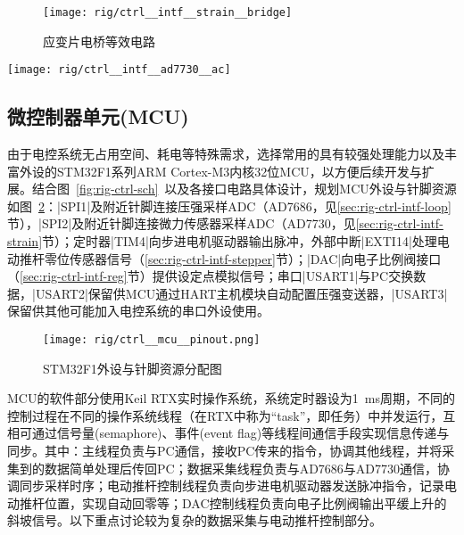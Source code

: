 \begin{figure}[p]
\centering
\texttt{[image: rig/ctrl\_\_intf\_\_strain\_\_bridge]}
\caption{应变片电桥等效电路}
\label{fig:rig-ctrl-strain-bridge}
\end{figure}

\begin{sidewaysfigure}[p]
\centering
\texttt{[image: rig/ctrl\_\_intf\_\_ad7730\_\_ac]}
\caption{AD7730电桥接口 \csep 接法示意图}
\label{fig:rig-ctrl-ad7730-ac}
\end{sidewaysfigure}


\clearpage


\subsection{微控制器单元(MCU)}\label{sec:rig-ctrl-mcu}

由于电控系统无占用空间、耗电等特殊需求，选择常用的具有较强处理能力以及丰富外设的STM32F1系列ARM Cortex-M3内核32位MCU，以方便后续开发与扩展。结合图~\ref{fig:rig-ctrl-sch}~以及各接口电路具体设计，规划MCU外设与针脚资源如图~\ref{fig:rig-ctrl-mcu-pinout}：\bverb|SPI1|及附近针脚连接压强采样ADC（AD7686，见\ref{sec:rig-ctrl-intf-loop}节），\bverb|SPI2|及附近针脚连接微力传感器采样ADC（AD7730，见\ref{sec:rig-ctrl-intf-strain}节）；定时器\bverb|TIM4|向步进电机驱动器输出脉冲，外部中断\bverb|EXTI14|处理电动推杆零位传感器信号（\ref{sec:rig-ctrl-intf-stepper}节）；\bverb|DAC|向电子比例阀接口（\ref{sec:rig-ctrl-intf-reg}节）提供设定点模拟信号；串口\bverb|USART1|与PC交换数据，\bverb|USART2|保留供MCU通过HART主机模块自动配置压强变送器，\bverb|USART3|保留供其他可能加入电控系统的串口外设使用。

\begin{figure}[tbhp]
\centering
\texttt{[image: rig/ctrl\_\_mcu\_\_pinout.png]}
\caption{STM32F1外设与针脚资源分配图}
\label{fig:rig-ctrl-mcu-pinout}
\end{figure}

MCU的软件部分使用Keil RTX实时操作系统，系统定时器设为\SI{1}{\milli\second}周期，不同的控制过程在不同的操作系统线程（在RTX中称为``task''，即任务）中并发运行，互相可通过信号量(semaphore)、事件(event flag)等线程间通信手段实现信息传递与同步。其中：主线程负责与PC通信，接收PC传来的指令，协调其他线程，并将采集到的数据简单处理后传回PC；数据采集线程负责与AD7686与AD7730通信，协调同步采样时序；电动推杆控制线程负责向步进电机驱动器发送脉冲指令，记录电动推杆位置，实现自动回零等；DAC控制线程负责向电子比例阀输出平缓上升的斜坡信号。以下重点讨论较为复杂的数据采集与电动推杆控制部分。

